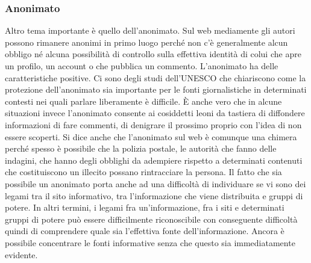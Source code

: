 \subsubsection{Anonimato}
Altro tema importante è quello dell'anonimato. Sul web mediamente gli autori possono rimanere anonimi in primo luogo perché non c'è generalmente alcun obbligo né alcuna possibilità di controllo sulla effettiva identità di colui che apre un profilo, un account o che pubblica un commento. 
L'anonimato ha delle caratteristiche positive. Ci sono degli studi dell'UNESCO che chiariscono come la protezione dell'anonimato sia importante per le fonti giornalistiche in determinati contesti nei quali parlare liberamente è difficile. 
È anche vero che in alcune situazioni invece l'anonimato consente ai cosiddetti leoni da tastiera di diffondere informazioni di fare commenti, di denigrare il prossimo proprio con l'idea di non essere scoperti. 
Si dice anche che l'anonimato sul web è comunque una chimera perché spesso è possibile che la polizia postale, le autorità che fanno delle indagini, che hanno degli obblighi da adempiere rispetto a determinati contenuti che costituiscono un illecito possano rintracciare la persona.
Il fatto che sia possibile un anonimato porta anche ad una difficoltà di individuare se vi sono dei legami tra il sito informativo, tra l'informazione che viene distribuita e gruppi di potere. In altri termini, i legami fra un'informazione, fra i siti e determinati gruppi di potere può essere difficilmente riconoscibile con conseguente difficoltà quindi di comprendere quale sia l'effettiva fonte dell'informazione.
Ancora è possibile concentrare le fonti informative senza che questo sia immediatamente evidente. 
